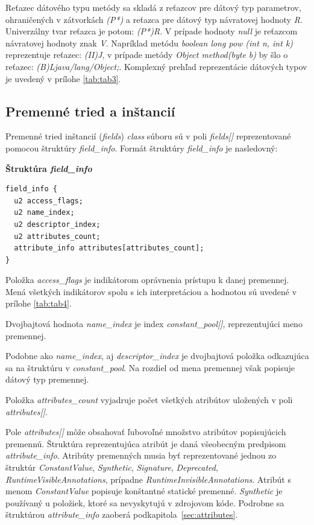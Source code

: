 \documentclass[11pt,final,oneside]{fithesis}
\newenvironment{example}[1]
{
\vspace{3mm}
\noindent\textbf{#1}
\vspace{2mm}
}
{
\vspace{3mm}
}
\begin{document}
Reťazec dátového typu metódy sa skladá z reťazcov pre dátový typ parametrov,
ohraničených v zátvorkách \textit{(P*)} a reťazca pre dátový typ návratovej
hodnoty \textit{R}. Univerzálny tvar reťazca je potom:
\textit{(P*)R}.
V prípade hodnoty \textit{null} je reťazcom návratovej hodnoty znak
\textit{V}. Napríklad metódu \textit{boolean long pow (int n, int k)}
reprezentuje reťazec: \textit{(II)J}, v prípade metódy
\textit{Object method(byte b)} by šlo o reťazec:
\textit{(B)Ljava/lang/Object;}. Komplexný prehľad reprezentácie dátových typov
je uvedený v prílohe \ref{tab:tab3}.

\subsection{Premenné tried a inštancií}
\label{sec:fields}
Premenné tried inštancií (\textit{fields}) \textit{class} súboru sú v poli
\textit{fields[]} reprezentované pomocou štruktúry \textit{field\_info}.
Formát štruktúry \textit{field\_info} je nasledovný:

\begin{example}{Štruktúra \textit{field\_info}}
\begin{verbatim}
field_info {
  u2 access_flags;
  u2 name_index;
  u2 descriptor_index;
  u2 attributes_count;
  attribute_info attributes[attributes_count];
}
\end{verbatim}
\end{example}

Položka \textit{access\_flags} je indikátorom oprávnenia prístupu k danej
premennej. Mená všetkých indikátorov spolu s ich interpretáciou a hodnotou sú 
uvedené v prílohe \ref{tab:tab4}.
     
Dvojbajtová hodnota \textit{name\_index} je index \textit{constant\_pool[]},
reprezentujúci meno premennej.

Podobne ako \textit{name\_index}, aj \textit{descriptor\_index} je dvojbajtová
položka odkazujúca sa na štruktúru v \textit{constant\_pool}. Na rozdiel od
mena premennej však popisuje dátový typ premennej.

Položka \textit{attributes\_count} vyjadruje počet všetkých atribútov 
uložených v poli \textit{attributes[]}.

Pole \textit{attributes[]} môže obsahovať ľubovoľné množstvo atribútov
popisujúcich premennú. Štruktúra reprezentujúca atribút je daná všeobecným
predpisom \textit{attribute\_info}. Atribúty premenných musia byť
reprezentované jednou zo štruktúr \textit{ConstantValue}, \textit{Synthetic},
\textit{Signature}, \textit{Deprecated}, \textit{RuntimeVisibleAnnotations},
prípadne \textit{RuntimeInvisibleAnnotations}. Atribút s menom
\textit{ConstantValue} popisuje konštantné statické premenné.
\textit{Synthetic} je používaný u položiek, ktoré sa nevyskytujú v zdrojovom 
kóde. Podrobne sa štruktúrou \textit{attribute\_info} zaoberá
podkapitola~\ref{sec:attributes}.
\end{document}
